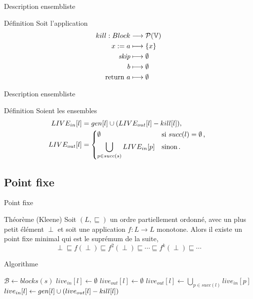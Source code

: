 \documentclass{beamer}
\begin{document}
\begin{frame}{Description ensembliste}
	\begin{block}{Définition}
		Soit l'application
		\begin{align*}
			kill : Block &\longrightarrow \mathcal{P}(\mathbb{V})\\
			{x}\space:=\space{a} &\longmapsto \{x\}\\
			\textit{skip} &\longmapsto \emptyset\\
			b &\longmapsto \emptyset\\
			\text{return }{a} &\longmapsto \emptyset
		\end{align*}
	\end{block}
\end{frame}

\begin{frame}{Description ensembliste}
	\begin{block}{Définition}
		Soient les ensembles
		\begin{align*}
			\livein{l} &= \sgen{l} \cup (\liveout{l} - \skill{l}),\\
			\liveout{l} &= 
			\begin{dcases*}
			\emptyset &si $succ(l) = \emptyset $\,, \\
			\bigcup\limits_{p\in succ(s)} \livein{p} &sinon\,.
			\end{dcases*}
		\end{align*}
	\end{block}
\end{frame}

\subsection{Point fixe}
\begin{frame}{Point fixe}
	\begin{block}{Théorème (Kleene)}
		Soit $(L, \sqsubseteq)$ un ordre partiellement ordonné, avec un plus petit élément  $\perp$ et soit
		une application $f : L \longrightarrow L$ monotone. Alors il existe un point fixe minimal qui est le suprémum de la suite,
		\[\perp \sqsubseteq f(\perp) \sqsubseteq f^2(\perp) \sqsubseteq \cdots \sqsubseteq f^k(\perp) \sqsubseteq \cdots\]
	\end{block}	
\end{frame}

\begin{frame}{Algorithme}
	\begin{algorithmic}
		\State $\mathcal{B} \leftarrow blocks(s)$
		\State $live_{in}[l] \leftarrow \emptyset$
		\State $live_{out}[l] \leftarrow \emptyset$
		\EndFor
		\State $live_{out}[l] \leftarrow \bigcup\limits_{p\in succ(l)} live_{in}[p]$
		\State $live_{in}[l] \leftarrow gen[l] \cup (live_{out}[l] - kill[l])$
		\EndFor
		\EndWhile
	\end{algorithmic}
\end{frame}
\end{document}
